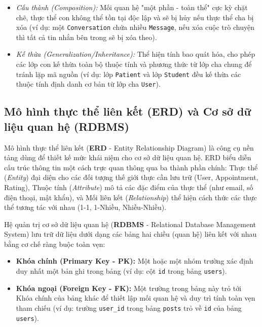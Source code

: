 \documentclass[a4paper,12pt]{report}
\begin{document}
\begin{itemize}
\begin{itemize}
        \item \textit{Cấu thành (Composition):} Mối quan hệ "một phần - toàn thể" cực kỳ chặt chẽ, thực thể con không thể tồn tại độc lập và sẽ bị hủy nếu thực thể cha bị xóa (ví dụ: một \texttt{Conversation} chứa nhiều \texttt{Message}, nếu xóa cuộc trò chuyện thì tất cả tin nhắn bên trong sẽ bị xóa theo).
        \item \textit{Kế thừa (Generalization/Inheritance):} Thể hiện tính bao quát hóa, cho phép các lớp con kế thừa toàn bộ thuộc tính và phương thức từ lớp cha chung để tránh lặp mã nguồn (ví dụ: lớp \texttt{Patient} và lớp \texttt{Student} đều kế thừa các thuộc tính định danh cơ bản từ lớp cha \texttt{User}).
    \end{itemize}
\end{itemize}

\subsection{Mô hình thực thể liên kết (ERD) và Cơ sở dữ liệu quan hệ (RDBMS)}
Mô hình thực thể liên kết (\textbf{ERD} - Entity Relationship Diagram) là công cụ nền tảng dùng để thiết kế mức khái niệm cho cơ sở dữ liệu quan hệ. ERD biểu diễn cấu trúc thông tin một cách trực quan thông qua ba thành phần chính: Thực thể (\textit{Entity}) đại diện cho các đối tượng thế giới thực cần lưu trữ (User, Appointment, Rating), Thuộc tính (\textit{Attribute}) mô tả các đặc điểm của thực thể (như email, số điện thoại, mật khẩu), và Mối liên kết (\textit{Relationship}) thể hiện cách thức các thực thể tương tác với nhau (1-1, 1-Nhiều, Nhiều-Nhiều).

Hệ quản trị cơ sở dữ liệu quan hệ (\textbf{RDBMS} - Relational Database Management System) lưu trữ dữ liệu dưới dạng các bảng hai chiều (quan hệ) liên kết với nhau bằng cơ chế ràng buộc toàn vẹn:
\begin{itemize}
    \item \textbf{Khóa chính (Primary Key - PK):} Một hoặc một nhóm trường xác định duy nhất một bản ghi trong bảng (ví dụ: cột \texttt{id} trong bảng \texttt{users}).
    \item \textbf{Khóa ngoại (Foreign Key - FK):} Một trường trong bảng này trỏ tới Khóa chính của bảng khác để thiết lập mối quan hệ và duy trì tính toàn vẹn tham chiếu (ví dụ: trường \texttt{user_id} trong bảng \texttt{posts} trỏ về \texttt{id} của bảng \texttt{users}).
\end{itemize}
\end{document}
